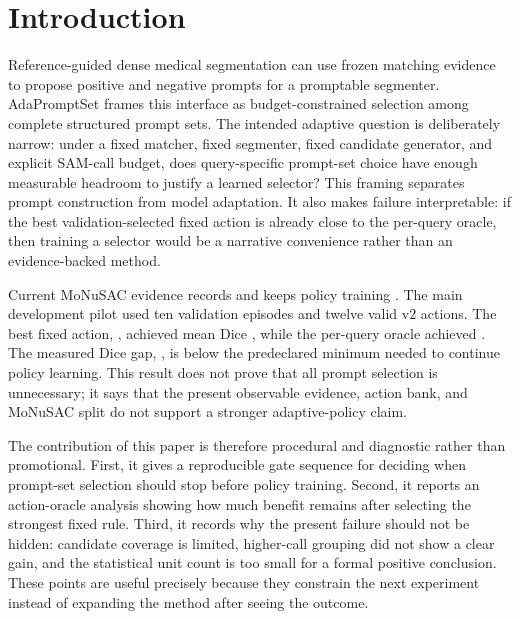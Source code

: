 \section{Introduction}
Reference-guided dense medical segmentation can use frozen matching evidence to propose positive and negative prompts for a promptable segmenter. AdaPromptSet frames this interface as budget-constrained selection among complete structured prompt sets. The intended adaptive question is deliberately narrow: under a fixed matcher, fixed segmenter, fixed candidate generator, and explicit SAM-call budget, does query-specific prompt-set choice have enough measurable headroom to justify a learned selector? This framing separates prompt construction from model adaptation. It also makes failure interpretable: if the best validation-selected fixed action is already close to the per-query oracle, then training a selector would be a narrative convenience rather than an evidence-backed method.

Current MoNuSAC evidence records \OracleAnalysisDecision{} and keeps policy training \OracleAnalysisPolicyTraining{}. The main development pilot used ten validation episodes and twelve valid v2 actions. The best fixed action, \OracleAnalysisBestFixed{}, achieved mean Dice \OracleAnalysisBestFixedDice{}, while the per-query oracle achieved \OracleAnalysisOracleDice{}. The measured Dice gap, \OracleAnalysisGap{}, is below the predeclared minimum needed to continue policy learning. This result does not prove that all prompt selection is unnecessary; it says that the present observable evidence, action bank, and MoNuSAC split do not support a stronger adaptive-policy claim.

The contribution of this paper is therefore procedural and diagnostic rather than promotional. First, it gives a reproducible gate sequence for deciding when prompt-set selection should stop before policy training. Second, it reports an action-oracle analysis showing how much benefit remains after selecting the strongest fixed rule. Third, it records why the present failure should not be hidden: candidate coverage is limited, higher-call grouping did not show a clear gain, and the statistical unit count is too small for a formal positive conclusion. These points are useful precisely because they constrain the next experiment instead of expanding the method after seeing the outcome.
